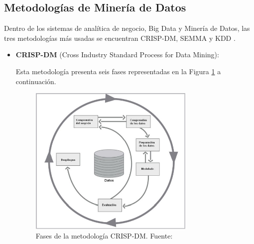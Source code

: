 \subsection{Metodologías de Minería de Datos}
Dentro de los sistemas de analítica de negocio, Big Data y Minería de Datos, las tres metodologías más usadas se encuentran CRISP-DM, SEMMA y KDD \parencite{tec_braulio2015metodologiasdm}.
\begin{itemize}
	\item \textbf{CRISP-DM} (Cross Industry Standard Process for Data Mining):
	
	Esta metodología presenta seis fases representadas en la Figura \ref{2:fig8} a continuación.
	\begin{figure}[h]
		\begin{center}
			\includegraphics[width=0.75\textwidth]{2/figures/crispdm.jpg}
			\caption{Fases de la metodología CRISP-DM. Fuente: \cite{tec_braulio2015metodologiasdm}}
			\label{2:fig8}
		\end{center}
	\end{figure}
		

\end{itemize}
